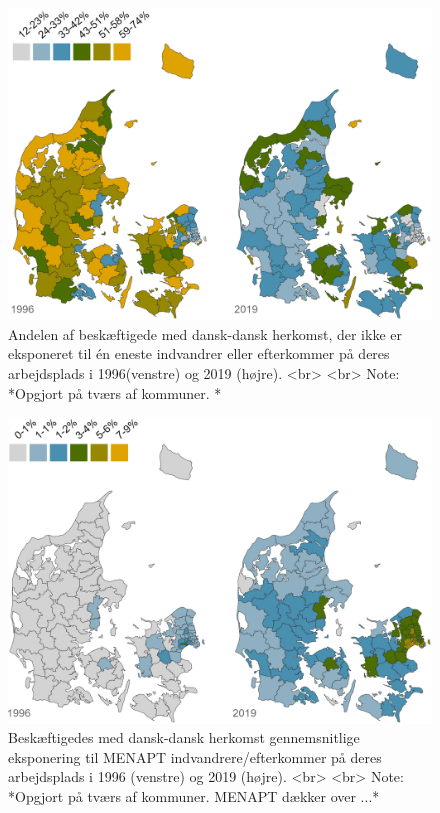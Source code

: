 \documentclass[
]{book}
\begin{document}
\begin{figure}
\includegraphics[width=1\linewidth]{images/Figur_4_2} \caption{Andelen af beskæftigede med dansk-dansk herkomst, der ikke er eksponeret til én eneste indvandrer eller efterkommer på deres arbejdsplads i 1996(venstre) og 2019 (højre). <br> <br> Note: *Opgjort på tværs af kommuner. *}\label{fig:fig-4-2}
\end{figure}

\begin{figure}
\includegraphics[width=1\linewidth]{images/Figur_4_3} \caption{Beskæftigedes med dansk-dansk herkomst gennemsnitlige eksponering til MENAPT indvandrere/efterkommer på deres arbejdsplads i 1996 (venstre) og 2019 (højre). <br> <br> Note: *Opgjort på tværs af kommuner. MENAPT dækker over ...*}\label{fig:fig-4-3}
\end{figure}
\end{document}
